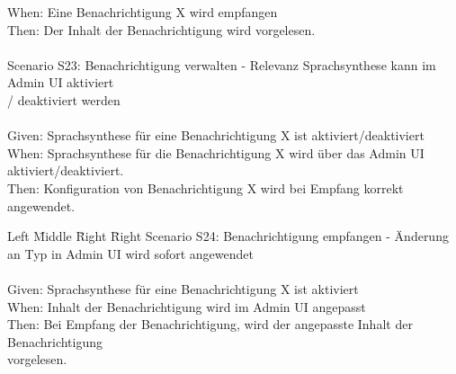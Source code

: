 \begin{tabbing}
    When:   \> \> \> Eine Benachrichtigung X wird empfangen \\
    Then:   \> \> \> Der Inhalt der Benachrichtigung wird vorgelesen. \\
    \\
    Scenario S23: \> \> \> Benachrichtigung verwalten - Relevanz Sprachsynthese kann im Admin UI aktiviert \\
    \> \> \>  / deaktiviert werden \\ \\
    Given:  \> \> \> Sprachsynthese für eine Benachrichtigung X ist aktiviert/deaktiviert \\
    When:   \> \> \> Sprachsynthese für die Benachrichtigung X wird über das Admin UI aktiviert/deaktiviert. \\
    Then:   \> \> \> Konfiguration von Benachrichtigung X wird bei Empfang korrekt angewendet. \\
    \clearpage
\end{tabbing}
\begin{tabbing}
    Left \= Middle \= Right \= Right \kill
    Scenario S24: \> \> \> Benachrichtigung empfangen - Änderung an Typ in Admin UI wird sofort angewendet \\ \\
    Given:  \> \> \> Sprachsynthese für eine Benachrichtigung X ist aktiviert \\
    When:   \> \> \> Inhalt der Benachrichtigung wird im Admin UI angepasst\\
    Then:   \> \> \> Bei Empfang der Benachrichtigung, wird der angepasste Inhalt der Benachrichtigung  \\
    \> \> \> vorgelesen.\\
    \\
\end{tabbing}
